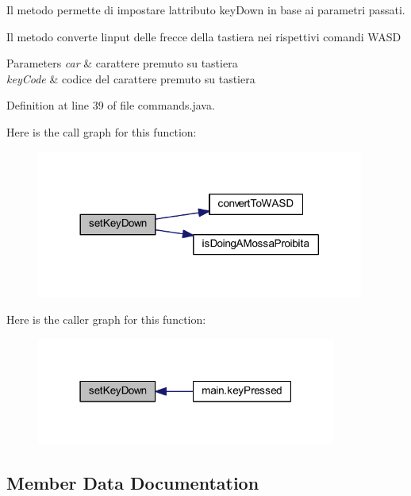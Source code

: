 Il metodo permette di impostare l\textquotesingle{}attributo key\+Down in base ai parametri passati. 

Il metodo converte l\textquotesingle{}input delle frecce della tastiera nei rispettivi comandi W\+A\+SD 
\begin{DoxyParams}{Parameters}
{\em car} & carattere premuto su tastiera \\
\hline
{\em key\+Code} & codice del carattere premuto su tastiera \\
\hline
\end{DoxyParams}


Definition at line 39 of file commands.\+java.

Here is the call graph for this function\+:
\nopagebreak
\begin{figure}[H]
\begin{center}
\leavevmode
\includegraphics[width=305pt]{class_snake_1_1game_1_1utility_1_1commands_a116fb077976b2f81b0fc36845423fadb_cgraph}
\end{center}
\end{figure}
Here is the caller graph for this function\+:
\nopagebreak
\begin{figure}[H]
\begin{center}
\leavevmode
\includegraphics[width=279pt]{class_snake_1_1game_1_1utility_1_1commands_a116fb077976b2f81b0fc36845423fadb_icgraph}
\end{center}
\end{figure}


\subsection{Member Data Documentation}
\mbox{\label{class_snake_1_1game_1_1utility_1_1commands_a09bac1b4079089c0f6a6eff874a820b8}} 
